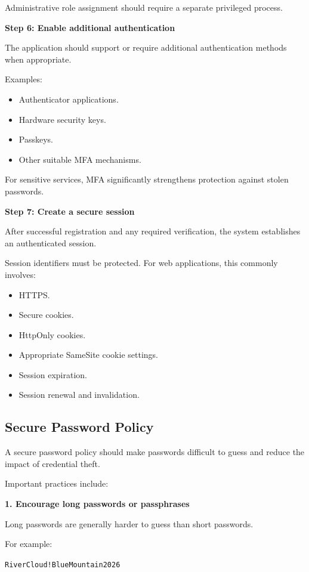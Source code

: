 Administrative role assignment should require a separate privileged process.

\textbf{Step 6: Enable additional authentication}

The application should support or require additional authentication methods when appropriate.

Examples:

\begin{itemize}
\item Authenticator applications.
\item Hardware security keys.
\item Passkeys.
\item Other suitable MFA mechanisms.
\end{itemize}

For sensitive services, MFA significantly strengthens protection against stolen passwords.

\textbf{Step 7: Create a secure session}

After successful registration and any required verification, the system establishes an authenticated session.

Session identifiers must be protected. For web applications, this commonly involves:

\begin{itemize}
\item HTTPS.
\item Secure cookies.
\item HttpOnly cookies.
\item Appropriate SameSite cookie settings.
\item Session expiration.
\item Session renewal and invalidation.
\end{itemize}

\subsection{Secure Password Policy}

A secure password policy should make passwords difficult to guess and reduce the impact of credential theft.

Important practices include:

\textbf{1. Encourage long passwords or passphrases}

Long passwords are generally harder to guess than short passwords.

For example:

\texttt{RiverCloud!BlueMountain2026}


